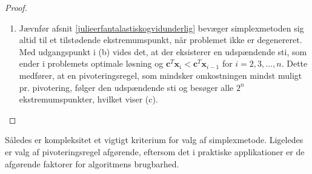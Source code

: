 \begin{proof}
\begin{enumerate}[label = (\alph*)]
%
\item Jævnfør afsnit \ref{julieerfantalastiskogvidunderlig} bevæger simplexmetoden sig altid til et tilstødende ekstremumspunkt, når problemet ikke er degenereret.
Med udgangspunkt i (b) vides det, at der eksisterer en udspændende sti, som ender i problemets optimale løsning og $\textbf{c}^T\textbf{x}_i < \textbf{c}^T\textbf{x}_{i-1}$ for $i = 2, 3, \ldots ,n$.
Dette medfører, at en pivoteringsregel, som mindsker omkostningen mindst muligt pr. pivotering, følger den udspændende sti og besøger alle $2^n$ ekstremumspunkter, hvilket viser (c).
\end{enumerate}
\end{proof}
%
Således er kompleksitet et vigtigt kriterium for valg af simplexmetode.
Ligeledes er valg af pivoteringsregel afgørende, eftersom det i praktiske applikationer er de afgørende faktorer for algoritmens brugbarhed.
